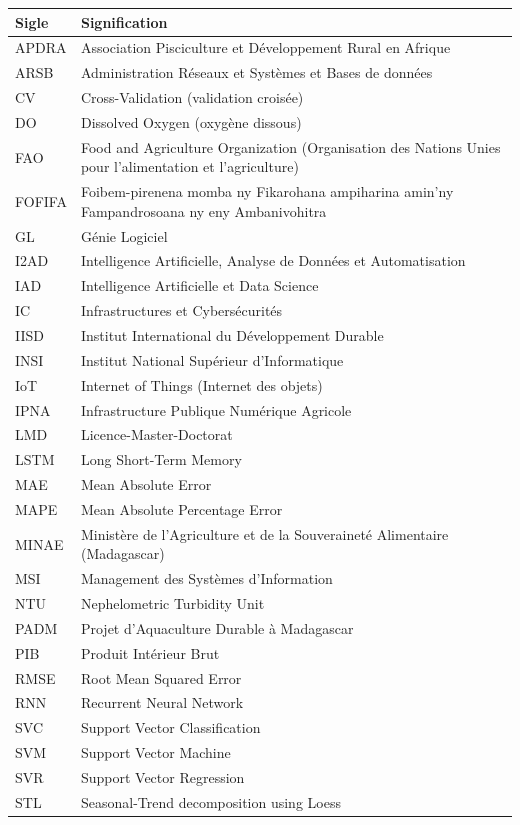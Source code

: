 \documentclass[a4paper,12pt, oneside]{article}
\begin{document}
\begin{longtable}{|p{3.5cm}|p{13cm}|}
\hline
\textbf{Sigle} & \textbf{Signification} \\
\hline
APDRA & Association Pisciculture et Développement Rural en Afrique \\
\hline
ARSB & Administration Réseaux et Systèmes et Bases de données \\
\hline
CV & Cross-Validation (validation croisée) \\
\hline
DO & Dissolved Oxygen (oxygène dissous) \\
\hline
FAO & Food and Agriculture Organization (Organisation des Nations Unies pour l'alimentation et l'agriculture) \\
\hline
FOFIFA & Foibem-pirenena momba ny Fikarohana ampiharina amin'ny Fampandrosoana ny eny Ambanivohitra\\
\hline
GL & Génie Logiciel \\
\hline
I2AD & Intelligence Artificielle, Analyse de Données et Automatisation \\
\hline
IAD & Intelligence Artificielle et Data Science \\
\hline
IC & Infrastructures et Cybersécurités \\
\hline
IISD & Institut International du Développement Durable \\
\hline
INSI & Institut National Supérieur d'Informatique \\
\hline
IoT & Internet of Things (Internet des objets) \\
\hline
IPNA & Infrastructure Publique Numérique Agricole \\
\hline
LMD & Licence-Master-Doctorat \\
\hline
LSTM & Long Short-Term Memory \\
\hline
MAE & Mean Absolute Error \\
\hline
MAPE & Mean Absolute Percentage Error \\
\hline
MINAE & Ministère de l'Agriculture et de la Souveraineté Alimentaire (Madagascar) \\
\hline
MSI & Management des Systèmes d'Information \\
\hline
NTU & Nephelometric Turbidity Unit \\
\hline
PADM & Projet d'Aquaculture Durable à Madagascar \\
\hline
PIB & Produit Intérieur Brut \\
\hline
RMSE & Root Mean Squared Error \\
\hline
RNN & Recurrent Neural Network \\
\hline
SVC & Support Vector Classification \\
\hline
SVM & Support Vector Machine \\
\hline
SVR & Support Vector Regression \\
\hline
STL & Seasonal-Trend decomposition using Loess \\
\hline
\end{longtable}
\end{document}
